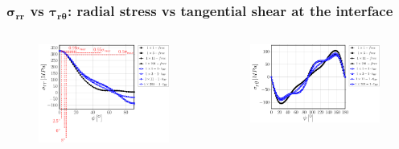 \documentclass[first,firstsupp,lastsupp,last,hyperref,table]{ETHclass}
\begin{document}
\begin{frame}
\frametitle{\vspace{0.2cm}\small $\mathbf{\sigma_{rr}}$ vs $\mathbf{\tau_{r\theta}}$: radial stress vs tangential shear at the interface}
\vspace{-.75cm}
\centering
\begin{columns}[c]
\centering
\begin{column}{0.5\textwidth}
\centering
\begin{figure}
\centering
\includegraphics[width=\columnwidth]{vf60-nodamage-sigmar.pdf}
\end{figure}
\end{column}
\begin{column}{0.5\textwidth}
\centering
\begin{figure}
\centering
\includegraphics[width=\columnwidth]{vf60-nodamage-taurt.pdf}
\end{figure}

\end{column}
\end{columns}
\end{frame}
\end{document}
